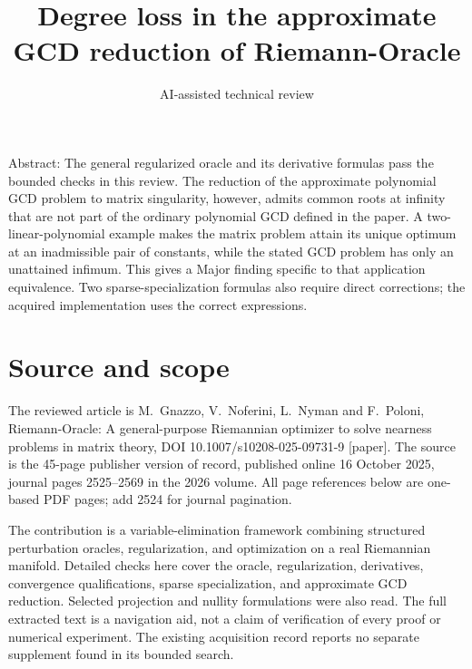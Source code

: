 \documentclass[10pt]{article}
\title{Degree loss in the approximate GCD reduction of Riemann-Oracle}
\author{AI-assisted technical review}
\date{}
\begin{document}
\maketitle
Abstract: The general regularized oracle and its derivative formulas pass the bounded checks in this review. The reduction of the approximate polynomial GCD problem to matrix singularity, however, admits common roots at infinity that are not part of the ordinary polynomial GCD defined in the paper. A two-linear-polynomial example makes the matrix problem attain its unique optimum at an inadmissible pair of constants, while the stated GCD problem has only an unattained infimum. This gives a Major finding specific to that application equivalence. Two sparse-specialization formulas also require direct corrections; the acquired implementation uses the correct expressions.\par
\section*{Source and scope}
The reviewed article is M. Gnazzo, V. Noferini, L. Nyman and F. Poloni, Riemann-Oracle: A general-purpose Riemannian optimizer to solve nearness problems in matrix theory, DOI 10.1007/s10208-025-09731-9 [paper]. The source is the 45-page publisher version of record, published online 16 October 2025, journal pages 2525–2569 in the 2026 volume. All page references below are one-based PDF pages; add 2524 for journal pagination.\par
The contribution is a variable-elimination framework combining structured perturbation oracles, regularization, and optimization on a real Riemannian manifold. Detailed checks here cover the oracle, regularization, derivatives, convergence qualifications, sparse specialization, and approximate GCD reduction. Selected projection and nullity formulations were also read. The full extracted text is a navigation aid, not a claim of verification of every proof or numerical experiment. The existing acquisition record reports no separate supplement found in its bounded search.\par
\end{document}
